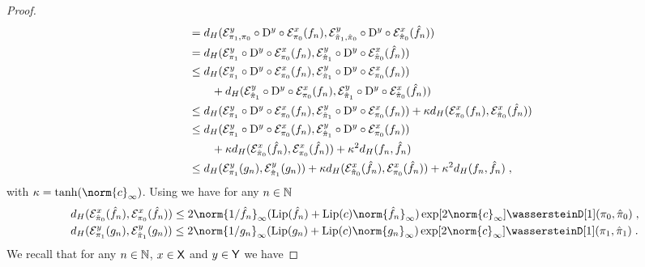 \documentclass[11pt,a4paper]{article}
\providecommand{\DIFaddbegin}{} %
\providecommand{\DIFaddend}{} %
\begin{document}
\begin{proof}
\begin{align}
                                & \quad = d_H(\mce_{\pi_1, \pi_0}^y \circ \rmD^y \circ \mce_{\pi_0}^x(f_n), \mce_{\hat{\pi}_1, \hat{\pi}_0}^y \circ \rmD^y \circ \mce_{\hat{\pi}_0}^x(\hat{f}_n)) \\
                                & \quad = d_H(\mce_{\pi_1}^y \circ \rmD^y \circ \mce_{\pi_0}^x(f_n), \mce_{\hat{\pi}_1}^y \circ \rmD^y \circ \mce_{\hat{\pi}_0}^x(\hat{f}_n)) \\
                                & \quad \leq d_H(\mce_{\pi_1}^y \circ \rmD^y \circ \mce_{\pi_0}^x(f_n), \mce_{\hat{\pi}_1}^y \circ \rmD^y \circ \mce_{\pi_0}^x(f_n)) \\
                                & \quad  \qquad + d_H(\mce_{\hat{\pi}_1}^y \circ \rmD^y \circ \mce_{\pi_0}^x({f}_n), \mce_{\hat{\pi}_1}^y \circ \rmD^y \circ \mce_{\hat{\pi}_0}^x(\hat{f}_n)) \\
    & \quad \leq d_H(\mce_{\pi_1}^y \circ \rmD^y \circ \mce_{\pi_0}^x(f_n), \mce_{\hat{\pi}_1}^y \circ \rmD^y \circ \mce_{\pi_0}^x(f_n)) + \kappa d_H(\mce_{\pi_0}^x(f_n), \mce_{\hat{\pi}_0}^x(\hat{f}_n)) \\
    & \quad \leq d_H(\mce_{\pi_1}^y \circ \rmD^y \circ \mce_{\pi_0}^x(f_n), \mce_{\hat{\pi}_1}^y \circ \rmD^y \circ \mce_{\pi_0}^x(f_n)) \\
    & \qquad \quad + \kappa d_H(\mce_{\hat{\pi}_0}^x(\hat{f}_n), \mce_{\pi_0}^x(\hat{f}_n)) + \kappa^2 d_H(f_n, \hat{f}_n)  \\
    & \quad \leq d_H(\mce_{\pi_1}^y (g_n), \mce_{\hat{\pi}_1}^y (g_n))  +\kappa  d_H(\mce_{\hat{\pi}_0}^x(\hat{f}_n), \mce_{\pi_0}^x(\hat{f}_n)) + \kappa^2 d_H(f_n, \hat{f}_n)  \DIFaddbegin \eqsp \DIFaddend ,    \label{eq:ineq_fonda}
  \end{align}
with $\kappa = \tanh(\norm{c}_\infty)$. 
Using  we have for any $n \in \mathbb{N}$
%
\begin{align}
  &d_H(\mce_{\hat{\pi}_0}^x(\hat{f}_n), \mce_{\pi_0}^x(\hat{f}_n)) \leq 2 \norm{1/\hat f_n}_\infty ( \Lip(\hat f_n)  + \Lip(c) \norm{\hat f_n}_\infty)\exp[2\norm{c}_\infty] \wassersteinD[1](\pi_0, \hat{\pi}_0) \DIFaddbegin \eqsp \DIFaddend , \\
  &d_H(\mce_{\pi_1}^y (g_n), \mce_{\hat{\pi}_1}^y (g_n)) \leq 2 \norm{1/g_n}_\infty (\Lip(g_n)  + \Lip(c)  \norm{g_n}_\infty)\exp[2\norm{c}_\infty] \wassersteinD[1](\pi_1, \hat{\pi}_1) \DIFaddbegin \eqsp \DIFaddend .
      \label{eq:n_step_bound}
\end{align}
%
We recall that for any $n \in \mathbb{N}$, $x \in \mathsf{X}$ and $y \in \mathsf{Y}$ we have

\end{proof}
\end{document}
